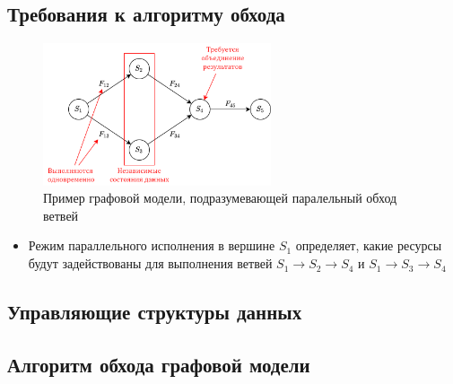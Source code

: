 \subsection{Требования к алгоритму обхода}
\begin{frame}


    \begin{figure}
        \centering
        \includegraphics[width=0.6\textwidth]{images/illustration.parallel_run.png}
        \caption{Пример графовой модели, подразумевающей паралельный обход ветвей}
    \end{figure}

    \begin{itemize}
        \item Режим параллельного исполнения в вершине $S_1$ определяет, какие ресурсы будут задействованы для выполнения ветвей $S_1 \to S_2 \to S_4$ и $S_1 \to S_3 \to S_4$
    \end{itemize}
\end{frame}

\subsection{Управляющие структуры данных}
\begin{frame}


\end{frame}
\subsection{Алгоритм обхода графовой модели}

